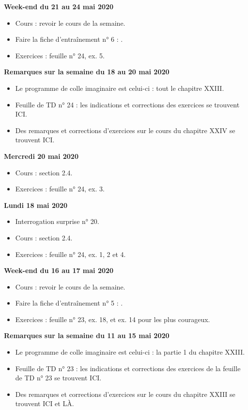 \documentclass[12pt,a4paper]{article}
\begin{document}
\noindent\textbf{Week-end du 21 au 24 mai 2020}
\begin{itemize}
\item Cours : revoir le cours de la semaine.
\item Faire la fiche d'entraînement n° 6 : .
\item Exercices : feuille n° 24, ex. 5.\vspace{.4cm}
\end{itemize}

\noindent\textbf{\bf Remarques sur la semaine du 18 au 20 mai 2020}
\begin{itemize}
\item Le programme de colle imaginaire est celui-ci : tout le chapitre XXIII.
\item Feuille de TD n° 24 : les indications et corrections des exercices se trouvent ICI.
\item Des remarques et corrections d'exercices sur le cours du chapitre XXIV se trouvent ICI.\vspace{.4cm}
\end{itemize}
 
\noindent\textbf{Mercredi 20 mai 2020}
\begin{itemize}
\item Cours : section 2.4.
\item Exercices : feuille n° 24, ex. 3.\vspace{.4cm}
\end{itemize}
 
\noindent\textbf{Lundi 18 mai 2020}
\begin{itemize}
\item Interrogation surprise n° 20.
\item Cours : section 2.4.
\item Exercices : feuille n° 24, ex. 1, 2 et 4.\vspace{.4cm}
\end{itemize}

\noindent\textbf{Week-end du 16 au 17 mai 2020}
\begin{itemize}
\item Cours : revoir le cours de la semaine.
\item Faire la fiche d'entraînement n° 5 : .
\item Exercices : feuille n° 23, ex. 18, et ex. 14 pour les plus courageux.\vspace{.4cm}
\end{itemize}

\noindent\textbf{\bf Remarques sur la semaine du 11 au 15 mai 2020}
\begin{itemize}
\item Le programme de colle imaginaire est celui-ci : la partie 1 du chapitre XXIII.
\item Feuille de TD n° 23 : les indications et corrections des exercices de la feuille de TD n° 23 se trouvent ICI.
\item Des remarques et corrections d'exercices sur le cours du chapitre XXIII se trouvent ICI et LÀ.\vspace{.4cm}
\end{itemize}
\end{document}
